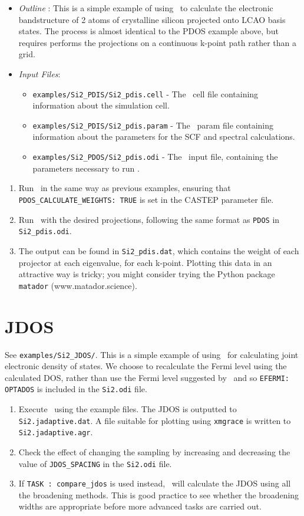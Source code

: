 \documentclass[a4paper,11pt,twoside]{book}
\begin{document}
{\begin{itemize}
\item \emph{Outline} : This is a simple example of using \optados\ to calculate the electronic bandstructure of 2 atoms of crystalline silicon projected onto LCAO basis states. The process is almost identical to the PDOS example above, but requires performs the projections on a continuous k-point path rather than a grid.

\item \emph{Input Files}:
\begin{itemize}
\item \verb#examples/Si2_PDIS/Si2_pdis.cell# - The \castep\ cell file containing information about the simulation cell.
\item \verb#examples/Si2_PDIS/Si2_pdis.param# - The \castep\ param file containing information about the parameters for the SCF and spectral calculations.
\item \verb#examples/Si2_PDOS/Si2_pdis.odi# - The \optados\ input file, containing the parameters necessary to run \optados.
\end{itemize}
\end{itemize}

\begin{enumerate}
\item Run \castep\ in the same way as previous examples, ensuring that \verb#PDOS_CALCULATE_WEIGHTS: TRUE# is set in the CASTEP parameter file.
\item Run \optados\ with the desired projections, following the same format as \verb#PDOS# in \verb#Si2_pdis.odi#.
\item The output can be found in \verb#Si2_pdis.dat#, which contains the weight of each projector at each eigenvalue, for each k-point. Plotting this data in an attractive way is tricky; you might consider trying the Python package \verb#matador# (www.matador.science).
\end{enumerate}

\section{JDOS}
See  \verb#examples/Si2_JDOS/#. This is a simple example of using \optados\ for calculating joint electronic density of states.  We choose to recalculate the Fermi level using the calculated DOS, rather than use the Fermi level suggested by \castep\, and so \verb#EFERMI: OPTADOS# is included in the \verb#Si2.odi# file.
\begin{enumerate}
\item Execute \optados\ using the example files.  The JDOS is outputted to {\tt Si2.jadaptive.dat}. A file suitable for plotting using {\tt xmgrace} is written to {\tt Si2.jadaptive.agr}.
\item Check the effect of changing the sampling by increasing and decreasing the value of \verb#JDOS_SPACING# in the \verb#Si2.odi# file.
\item If {\tt TASK : compare\_jdos} is used instead, \optados\ will calculate the JDOS using all the broadening methods.  This is good practice to see whether the broadening widths are appropriate before more advanced tasks are carried out.
\end{enumerate}

}
\end{document}
